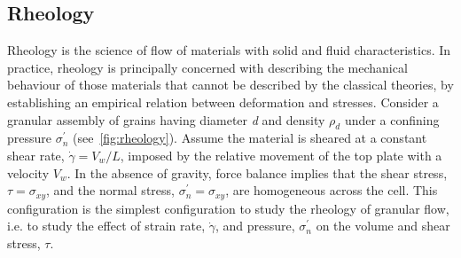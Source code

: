 \subsection{Rheology}
\label{sec:muI}
Rheology is the science of flow of materials with solid and fluid 
characteristics. In practice, rheology is principally concerned with describing 
the mechanical behaviour of those materials that cannot be described by the 
classical theories, by establishing an empirical relation between deformation 
and stresses. Consider a granular assembly of grains having diameter 
\textit{d} and density $\rho_{\mathit{d}}$ under a confining pressure 
$\sigma_n^\prime$ (see~\cref{fig:rheology}). Assume the material is sheared 
at a constant shear rate, $\dot{\gamma} = \mathit{V}_{\mathit{w}} / 
\mathit{L}$, imposed by the relative movement of the top plate with a velocity 
$\mathit{V}_{\mathit{w}}$. In the absence of gravity, force balance implies 
that the shear stress, $\tau= \sigma_{\mathit{xy}}$, and the normal stress, 
$\sigma_n^\prime=\sigma_{\mathit{xy}}$, are homogeneous across the cell. This 
configuration is the simplest configuration to study the rheology of granular 
flow, i.e. to study the effect of strain rate, $\dot{\gamma}$, and 
pressure, $\sigma_n^\prime$ on the volume and shear stress, $\tau$. 

